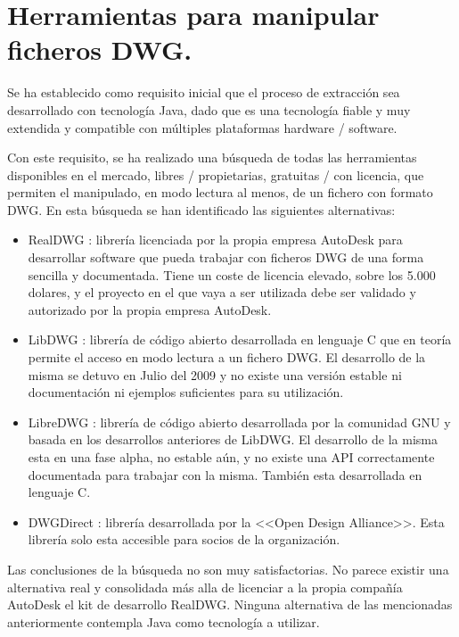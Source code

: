 \section{Herramientas para manipular ficheros DWG.}

Se ha establecido como requisito inicial que el proceso de extracción sea desarrollado con tecnología Java, dado que es una tecnología fiable y muy extendida y compatible con múltiples plataformas hardware / software. 

Con este requisito, se ha realizado una búsqueda de todas las herramientas disponibles en el mercado, libres / propietarias, gratuitas / con licencia, que permiten el manipulado, en modo lectura al menos, de un fichero con formato DWG. En esta búsqueda se han identificado las siguientes alternativas:

\begin{itemize}

\item{RealDWG \cite{RealDWG}: librería licenciada por la propia empresa AutoDesk para desarrollar software que pueda trabajar con ficheros DWG de una forma sencilla y documentada. Tiene un coste de licencia elevado, sobre los 5.000 dolares, y el proyecto en el que vaya a ser utilizada debe ser validado y autorizado por la propia empresa AutoDesk.}

\item{LibDWG \cite{LibDWG}: librería de código abierto desarrollada en lenguaje C que en teoría permite el acceso en modo lectura a un fichero DWG. El desarrollo de la misma se detuvo en Julio del 2009 y no existe una versión estable ni documentación ni ejemplos suficientes para su utilización.}

\item{LibreDWG \cite{LibreDWG}: librería de código abierto desarrollada por la comunidad GNU y basada en los desarrollos anteriores de LibDWG. El desarrollo de la misma esta en una fase alpha, no estable aún, y no existe una API correctamente documentada para trabajar con la misma. También esta desarrollada en lenguaje C.}

\item{DWGDirect \cite{OpenDWG}: librería desarrollada por la <<Open Design Alliance>>. Esta librería solo esta accesible para socios de la organización.}

\end{itemize}

Las conclusiones de la búsqueda no son muy satisfactorias. No parece existir una alternativa real y consolidada más alla de licenciar a la propia compañía AutoDesk el kit de desarrollo RealDWG. Ninguna alternativa de las mencionadas anteriormente contempla Java como tecnología a utilizar.

